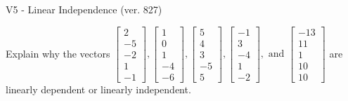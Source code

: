 \begin{exercise}
  \begin{exerciseTitle}V5 - Linear Independence (ver. 827)\end{exerciseTitle}
  \begin{exerciseStatement}
    Explain why the vectors \(\left[\begin{array}{r}
2 \\
-5 \\
-2 \\
1 \\
-1
\end{array}\right] , \left[\begin{array}{r}
1 \\
0 \\
1 \\
-4 \\
-6
\end{array}\right] , \left[\begin{array}{r}
5 \\
4 \\
3 \\
-5 \\
5
\end{array}\right] , \left[\begin{array}{r}
-1 \\
3 \\
-4 \\
1 \\
-2
\end{array}\right] , \text{ and } \left[\begin{array}{r}
-13 \\
11 \\
1 \\
10 \\
10
\end{array}\right]\) are linearly dependent or linearly independent.	



\end{exerciseStatement}
\end{exercise}
